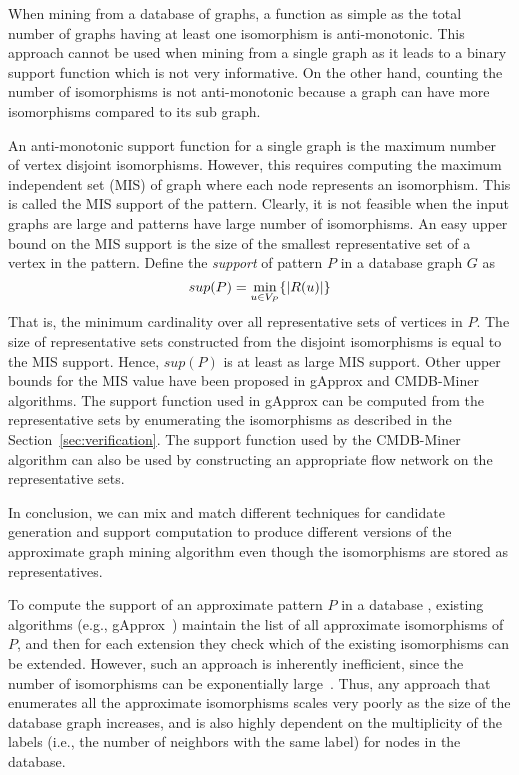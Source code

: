 When mining from a database of graphs, a function as simple as the total number
of graphs having at least one isomorphism is anti-monotonic. This approach cannot
be used when mining from a single graph as it leads to a binary support function
which is not very informative. On the other hand, counting the number of
isomorphisms is not anti-monotonic because a graph can have more isomorphisms
compared to its sub graph.

An anti-monotonic support function for a single graph is the maximum number of
vertex disjoint isomorphisms. However, this requires computing the maximum
independent set (MIS) of graph where each node represents an isomorphism.
This is called the MIS support of the pattern.
Clearly, it is not feasible when the input graphs are large and patterns have
large number of isomorphisms. An easy upper bound on the MIS support is the size
of the smallest representative set of a vertex in the pattern.  Define the {\em
support} of pattern $P$ in a database graph $G$ as $$sup(P) = \min_{u \in V_P}
\{ |R(u)| \}$$ That is, the minimum cardinality over all representative sets of
vertices in $P$.  The size of representative sets constructed from the disjoint
isomorphisms is equal to the MIS support. Hence, $sup(P)$ is at least as large
MIS support.  Other upper bounds for the MIS value have been proposed in gApprox
and CMDB-Miner algorithms. The support function used in gApprox can be computed
from the representative sets by enumerating the isomorphisms as described in the
Section~\ref{sec:verification}.  The support function used by the CMDB-Miner
algorithm can also be used by constructing an appropriate flow network on the
representative sets.

In conclusion, we can mix and match different techniques for candidate
generation and support computation to produce different versions of the
approximate graph mining algorithm even though the isomorphisms are stored as
representatives.

To compute the support of an approximate pattern $P$ in a database \db,
existing algorithms (e.g., gApprox~\cite{gapprox}) maintain the list of
all approximate isomorphisms of $P$, and then for each extension they
check which of the existing isomorphisms can be extended. However, such an
approach is inherently inefficient, since the number of isomorphisms can
be exponentially large~\cite{2011-icdm}.  Thus, any approach that
enumerates all the approximate isomorphisms scales very poorly as the size
of the database graph increases, and is also highly dependent on the
multiplicity of the labels (i.e., the number of neighbors with the same
label) for nodes in the database.

